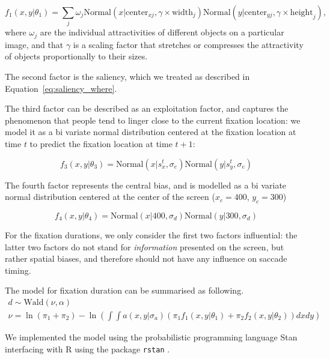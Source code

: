 \documentclass{article}
\begin{document}
\begin{equation}
    f_1(x, y | \theta_1) = \sum_j \omega_j \text{Normal}(x | \text{center}_{xj}, \gamma \times \text{width}_{j}) \text{Normal}(y | \text{center}_{yj}, \gamma \times\text{height}_{j}), 
\end{equation}
where $\omega_j$ are the individual attractivities of different objects on a particular image, and that $\gamma$ is a scaling factor that stretches or compresses the attractivity of objects proportionally to their sizes.

The second factor is the saliency, which we treated as described in Equation~\ref{eq:saliency_where}.

The third factor can be described as an exploitation factor, and captures the phenomenon that people tend to linger close to the current fixation location: we model it as a bi variate normal distribution centered at the fixation location at time $t$ to predict the fixation location at time $t+1$:

\begin{equation}
    f_3(x, y|\theta_3) = \text{Normal}(x | s_x^t, \sigma_e) \text{Normal}(y | s_y^t, \sigma_e)
\end{equation}

The fourth factor represents the central bias, and is modelled as a bi variate normal distribution centered at the center of the screen ($x_c = 400$, $y_c = 300$)

\begin{equation}
    f_4(x, y|\theta_4) = \text{Normal}(x | 400, \sigma_d) \text{Normal}(y | 300, \sigma_d)
\end{equation}

For the fixation durations, we only consider the first two factors influential: the latter two factors do not stand for \textit{information} presented on the screen, but rather spatial biases, and therefore should not have any influence on saccade timing.

The model for fixation duration can be summarised as following.
\begin{gather*}
    d \sim \text{Wald}(\nu, \alpha) \\
    \nu = \ln(\pi_1 + \pi_2) - \ln\left(\int\int a(x, y | \sigma_a) \left(\pi_1 f_1(x, y | \theta_1) + \pi_2 f_2(x, y | \theta_2)\right)dxdy\right)
\end{gather*}

We implemented the model using the probabilistic programming language Stan \citep{carpenter2017stan} interfacing with R \citep{citeR} using the package \texttt{rstan} \citep{team2020rstan}.
\end{document}
